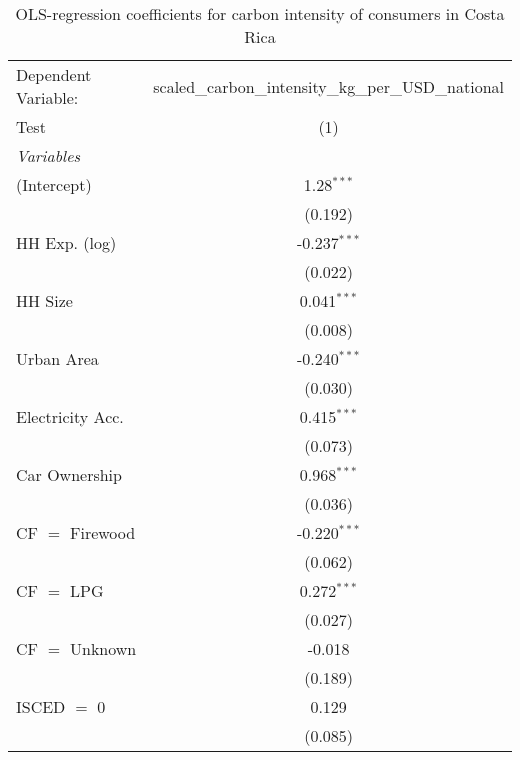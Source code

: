 
\begin{table}[htbp!]
   \centering
   \small
   \begin{adjustbox}{width = 1\textwidth, max height = 0.95\textheight, center}
      \begin{threeparttable}[b]
         \caption{\label{tab:OLS_1_CRI} OLS-regression coefficients for carbon intensity of consumers in Costa Rica}
         \begin{tabular}{lc}
            \tabularnewline \midrule \midrule
            Dependent Variable: & scaled\_carbon\_intensity\_kg\_per\_USD\_national\\        
            Test                & (1)\\  
            \midrule
            \emph{Variables}\\
            (Intercept)         & 1.28$^{***}$\\   
                                & (0.192)\\   
            HH Exp. (log)       & -0.237$^{***}$\\   
                                & (0.022)\\   
            HH Size             & 0.041$^{***}$\\   
                                & (0.008)\\   
            Urban Area          & -0.240$^{***}$\\   
                                & (0.030)\\   
            Electricity Acc.    & 0.415$^{***}$\\   
                                & (0.073)\\   
            Car Ownership       & 0.968$^{***}$\\   
                                & (0.036)\\   
            CF $=$ Firewood     & -0.220$^{***}$\\   
                                & (0.062)\\   
            CF $=$ LPG          & 0.272$^{***}$\\   
                                & (0.027)\\   
            CF $=$ Unknown      & -0.018\\   
                                & (0.189)\\   
            ISCED $=$ 0         & 0.129\\   
                                & (0.085)\\   

\end{tabular}
\end{threeparttable}
\end{adjustbox}
\end{table}

